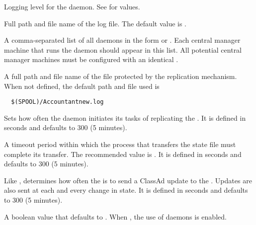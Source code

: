 \begin{description}
\label{param:HADDebug}
\item[\Macro{HAD\_DEBUG}]
  Logging level for the  daemon.
  See  for values.

\label{param:HADLog}
\item[\Macro{HAD\_LOG}]
  Full path and file name of the log file.
  The default value is .

\label{param:ReplicationList}
\item[\Macro{REPLICATION\_LIST}]
  A comma-separated list of all  daemons
  in the form  or .
  Each central manager machine that runs the  daemon
  should appear in this list.
  All potential central manager machines must be configured with
  an identical .

\label{param:StateFile}
\item[\Macro{STATE\_FILE}]
  A full path and file name of the file protected by the replication
  mechanism.
  When not defined, the default path and file used is
  \begin{verbatim}
  $(SPOOL)/Accountantnew.log
  \end{verbatim}

\label{param:ReplicationInterval}
\item[\Macro{REPLICATION\_INTERVAL}]
  Sets how often the  daemon initiates its tasks of
  replicating the .
  It is defined in seconds and defaults to 300 (5 minutes).

\label{param:MaxTransferLifetime}
\item[\Macro{MAX\_TRANSFERER\_LIFETIME}]
  A timeout period within which the process that
  transfers the state file must complete its transfer.
  The recommended value is
  .
  It is defined in seconds and defaults to 300 (5 minutes).

\label{param:HADUpdateInterval}
\item[\Macro{HAD\_UPDATE\_INTERVAL}]
  Like ,
  determines how often the  is to send a ClassAd update
  to the .
  Updates are also sent at each and every change in state.
  It is defined in seconds and defaults to 300 (5 minutes).

\label{param:HADUseReplication}
\item[\Macro{HAD\_USE\_REPLICATION}]
  A boolean value that defaults to .
  When , the use of  daemons is enabled.


\end{description}
